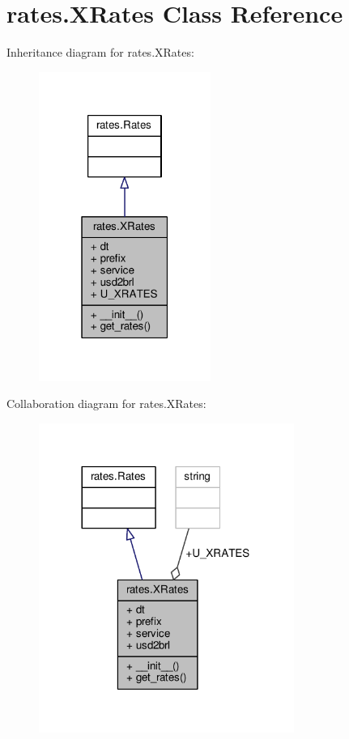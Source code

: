 \hypertarget{classrates_1_1_x_rates}{}\section{rates.\+X\+Rates Class Reference}
\label{classrates_1_1_x_rates}


Inheritance diagram for rates.\+X\+Rates\+:\nopagebreak
\begin{figure}[H]
\begin{center}
\leavevmode
\includegraphics[width=159pt]{classrates_1_1_x_rates__inherit__graph}
\end{center}
\end{figure}


Collaboration diagram for rates.\+X\+Rates\+:
\nopagebreak
\begin{figure}[H]
\begin{center}
\leavevmode
\includegraphics[width=236pt]{classrates_1_1_x_rates__coll__graph}
\end{center}
\end{figure}
